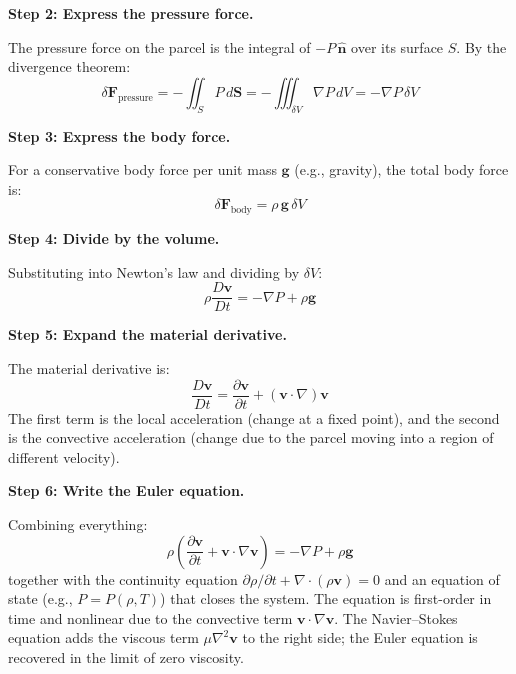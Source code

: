 \documentclass[11pt,openright]{book}
\begin{document}
\textbf{Step 2: Express the pressure force.}

The pressure force on the parcel is the integral of $-P\,\hat{\mathbf{n}}$ over its surface $S$. By the divergence theorem:
\begin{equation}
\delta\mathbf{F}_{\text{pressure}} = -\iint_S P\,d\mathbf{S} = -\iiint_{\delta V}\nabla P\,dV = -\nabla P\,\delta V
\end{equation}

\textbf{Step 3: Express the body force.}

For a conservative body force per unit mass $\mathbf{g}$ (e.g., gravity), the total body force is:
\begin{equation}
\delta\mathbf{F}_{\text{body}} = \rho\,\mathbf{g}\,\delta V
\end{equation}

\textbf{Step 4: Divide by the volume.}

Substituting into Newton's law and dividing by $\delta V$:
\begin{equation}
\rho\frac{D\mathbf{v}}{Dt} = -\nabla P + \rho\mathbf{g}
\end{equation}

\textbf{Step 5: Expand the material derivative.}

The material derivative is:
\begin{equation}
\frac{D\mathbf{v}}{Dt} = \frac{\partial \mathbf{v}}{\partial t} + (\mathbf{v} \cdot \nabla)\mathbf{v}
\end{equation}
The first term is the local acceleration (change at a fixed point), and the second is the convective acceleration (change due to the parcel moving into a region of different velocity).

\textbf{Step 6: Write the Euler equation.}

Combining everything:
\begin{equation}
\boxed{\rho\left(\frac{\partial \mathbf{v}}{\partial t} + \mathbf{v}\cdot\nabla\mathbf{v}\right) = -\nabla P + \rho\mathbf{g}}
\end{equation}
together with the continuity equation $\partial\rho/\partial t + \nabla\cdot(\rho\mathbf{v}) = 0$ and an equation of state (e.g., $P = P(\rho, T)$) that closes the system. The equation is first-order in time and nonlinear due to the convective term $\mathbf{v}\cdot\nabla\mathbf{v}$. The Navier--Stokes equation adds the viscous term $\mu\nabla^2\mathbf{v}$ to the right side; the Euler equation is recovered in the limit of zero viscosity.
\end{document}
